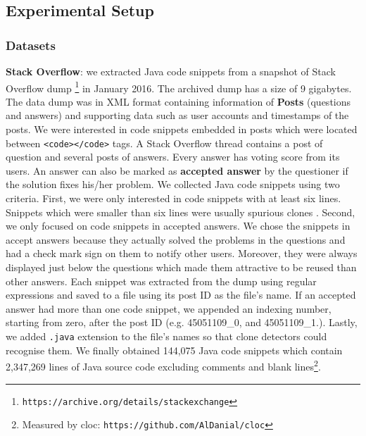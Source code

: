\documentclass[sigconf,review, anonymous]{acmart}
\begin{document}
\subsection{Experimental Setup}

\subsubsection{Datasets}

\textbf{Stack Overflow}: we extracted Java code snippets from a snapshot of Stack Overflow dump \footnote{{\small\texttt{https://archive.org/details/stackexchange}}} in January 2016. The archived dump has a size of 9 gigabytes. The data dump was in XML format containing information of \textbf{Posts} (questions and answers) and supporting data such as user accounts and timestamps of the posts. We were interested in code snippets embedded in posts which were located between {\small\texttt{<code></code>}} tags. A Stack Overflow thread contains a post of question and several posts of answers. Every answer has voting score from its users. An answer can also be marked as \textbf{accepted answer} by the questioner if the solution fixes his/her problem. We collected Java code snippets using two criteria. First, we were only interested in code snippets with at least six lines. Snippets which were smaller than six lines were usually spurious clones \cite{Bellon2007}. Second, we only focused on code snippets in accepted answers. We chose the snippets in accept answers because they actually solved the problems in the questions and had a check mark sign on them to notify other users. Moreover, they were always displayed just below the questions which made them attractive to be reused than other answers. Each snippet was extracted from the dump using regular expressions and saved to a file using its post ID as the file's name. If an accepted answer had more than one code snippet, we appended an indexing number, starting from zero, after the post ID (e.g. 45051109\_0, and 45051109\_1.). Lastly, we added {\small\texttt{.java}} extension to the file's names so that clone detectors could recognise them. We finally obtained 144,075 Java code snippets which contain 2,347,269 lines of Java source code excluding comments and blank lines\footnote{Measured by cloc: {\small\texttt{https://github.com/AlDanial/cloc}}}.
\end{document}
